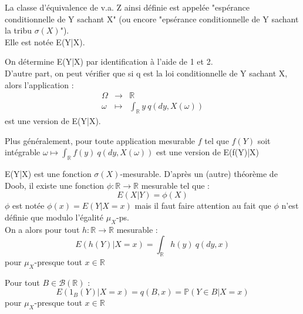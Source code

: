 \begin{Def}
La classe d'équivalence de v.a. Z ainsi définie est appelée "espérance conditionnelle de Y sachant X" (ou encore "epsérance conditionnelle de Y sachant la tribu $\sigma(X)$").
\\ Elle est notée E(Y|X).
\end{Def}

On détermine E(Y|X) par identification à l'aide de 1 et 2. \\
D'autre part, on peut vérifier que si q est la loi conditionnelle de Y sachant X, alors l'application : 
\begin{eqnarray*}
\Omega &\to& \mathbb{R} \\
\omega &\mapsto& \int_{\mathbb{R}} y\ q(dy,X(\omega))
\end{eqnarray*}
est une version de E(Y|X).

Plus généralement, pour toute application mesurable $f$ tel que $f(Y)$ soit intégrable $\omega \mapsto \int_{\mathbb{R}} f(y)\ q(dy,X(\omega))$ est une version de E(f(Y)|X)

\begin{rmq}
E(Y|X) est une fonction $\sigma(X)$-mesurable. D'après un (autre) théorème de Doob, il existe une fonction $\phi : \mathbb{R} \to \mathbb{R}$ mesurable tel que : 
\[E(X|Y)=\phi(X)\]
$\phi$ est notée $\phi(x)=E(Y|X=x)$ mais il faut faire attention au fait que $\phi$ n'est définie que modulo l'égalité $\mu_X$-ps.  \\
On a alors pour tout $h:\mathbb{R}\to \mathbb{R}$ mesurable : 
\[E(h(Y)|X=x) = \int_{\mathbb{R}} h(y)\ q(dy,x)\]
pour $\mu_X$-presque tout $x\in\mathbb{R}$
\end{rmq}

\begin{rmq}
Pour tout $B\in \mathcal{B}(\mathbb{R})$ :
\[E(1_B(Y)|X=x) = q(B,x) = \mathbb{P}(Y\in B|X=x)\]
pour $\mu_X$-presque tout $x\in\mathbb{R}$
\end{rmq}
